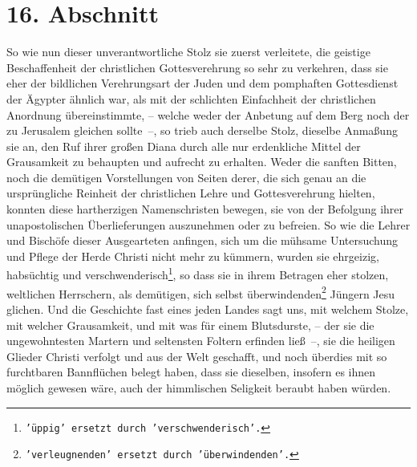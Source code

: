 \section{16. Abschnitt} \label{kap7_ab16}

So wie nun dieser unverantwortliche Stolz sie zuerst verleitete, die geistige
Beschaffenheit der christlichen Gottesverehrung so sehr
zu verkehren, dass sie
eher der bildlichen Verehrungsart der Juden und dem
pomphaften Gottesdienst
der Ägypter ähnlich war, als mit der schlichten
Einfachheit der christlichen
Anordnung übereinstimmte, -- welche weder der Anbetung auf dem Berg noch der zu
Jerusalem gleichen sollte~--, so trieb auch derselbe
Stolz, dieselbe
Anmaßung sie an, den Ruf ihrer großen Diana durch alle
nur erdenkliche
Mittel der Grausamkeit zu behaupten und aufrecht zu erhalten. Weder die sanften
Bitten, noch die demütigen Vorstellungen von Seiten derer, die sich genau an
die ursprüngliche Reinheit der christlichen Lehre und
Gottesverehrung hielten,
konnten diese hartherzigen Namenschristen
bewegen, sie von der Befolgung ihrer
unapostolischen Überlieferungen
auszunehmen oder zu befreien. So wie die Lehrer
und Bischöfe dieser Ausgearteten anfingen, sich um die
mühsame Untersuchung und
Pflege der Herde Christi nicht mehr zu kümmern, wurden sie ehrgeizig,
habsüchtig und verschwenderisch\footnote{\texttt{'üppig' ersetzt durch
'verschwenderisch'.}}, so dass sie in ihrem Betragen eher stolzen, weltlichen
Herrschern, als demütigen, sich selbst
überwindenden\footnote{\texttt{'verleugnenden' ersetzt durch 'überwindenden'.}}
Jüngern Jesu glichen.
Und die Geschichte fast eines jeden Landes sagt uns, mit welchem Stolze, mit
welcher Grausamkeit, und mit was für einem Blutsdurste, --
der sie die
ungewohntesten Martern und seltensten Foltern erfinden
ließ~--, sie die
heiligen Glieder Christi
verfolgt und aus der Welt geschafft, und noch
überdies mit so furchtbaren Bannflüchen belegt haben, dass
sie
dieselben,
insofern es ihnen möglich gewesen wäre, auch der himmlischen
Seligkeit beraubt
haben würden.

\medskip

